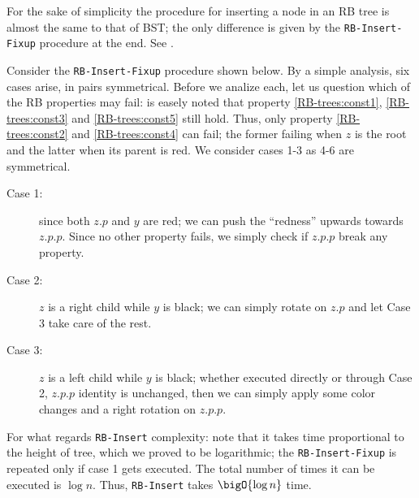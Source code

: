 \documentclass{subfiles}
\begin{document}
    For the sake of simplicity the procedure for inserting a node in an RB tree is 
        almost the same to that of BST; the only difference is given by the 
        \lstinline{RB-Insert-Fixup} procedure at the end. See .


    Consider the \lstinline{RB-Insert-Fixup} procedure shown below.
        By a simple analysis, six cases arise, in pairs symmetrical.
        Before we analize each, let us question which of the RB properties 
        may fail: is easely noted that property \ref{RB-trees:const1}, 
        \ref{RB-trees:const3} and \ref{RB-trees:const5} still hold.
        Thus, only property \ref{RB-trees:const2} and \ref{RB-trees:const4}
        can fail; the former failing when \(z\) is the root and the latter 
        when its parent is red. We consider cases 1-3 as 4-6 are symmetrical.

    \begin{description}
        \item [Case 1:] since both \(z.p\) and \(y\) are red;
            we can push the ``redness'' upwards towards \(z.p.p\).
            Since no other property fails, 
            we simply check if \(z.p.p\) break any property.

        \item [Case 2:] \(z\) is a right child while \(y\) is black;
            we can simply rotate on \(z.p\) and let Case 3 take care of the rest. 

        \item [Case 3:] \(z\) is a left child while \(y\) is black;
            whether executed directly or through Case 2, \(z.p.p\) identity is unchanged,
            then we can simply apply some color changes and a right rotation on \(z.p.p\).
    \end{description}

    For what regards \lstinline{RB-Insert} complexity: note that 
        it takes time proportional to the height of tree, 
        which we proved to be logarithmic; the \lstinline{RB-Insert-Fixup}
        is repeated only if case 1 gets executed. The total number of times 
        it can be executed is \(\log n\). Thus, \lstinline{RB-Insert} takes 
        \(\bigO{\log n}\) time.
\end{document}
